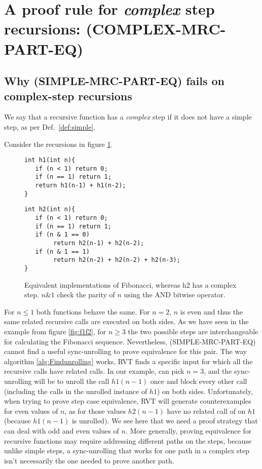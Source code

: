 \section{A proof rule for \emph{complex} step recursions: (COMPLEX-MRC-PART-EQ)}
\label{sec:multistep}
\subsection{Why (SIMPLE-MRC-PART-EQ) fails on complex-step recursions}
We say that a recursive function has a \emph{complex} step if it does not have a simple step, as per Def.~\ref{def:simple}. 

Consider the recursions in figure \ref{fig:f1f2cond}.
\begin{figure}[h]
\begin{center}
\begin{minipage}{7 cm}
\begin{lstlisting}
int h1(int n){
   if (n < 1) return 0;
   if (n == 1) return 1; 
   return h1(n-1) + h1(n-2);
}
\end{lstlisting}
\end{minipage}
\begin{minipage}{7 cm}
\begin{lstlisting}
int h2(int n){
   if (n < 1) return 0;
   if (n == 1) return 1; 
   if (n & 1 == 0)
        return h2(n-1) + h2(n-2);
   if (n & 1 == 1)
        return h2(n-2) + h2(n-2) + h2(n-3);
}
\end{lstlisting}
\end{minipage}
\caption{Equivalent implementations of Fibonacci, whereas h2 has a complex step. $n \& 1$ check the parity of $n$ using the AND bitwise operator.}
\label{fig:f1f2cond}
\end{center}
\end{figure}
For $n\leq 1$ both functions behave the same. For $n=2$, $n$ is even and thus the same related recursive calls are executed on both sides. As we have seen in the example from figure \ref{fig:f1f2}, for $n\geq3$ the two possible steps are interchangeable for calculating the Fibonacci sequence. Nevertheless, (SIMPLE-MRC-PART-EQ) cannot find a useful sync-unrolling to prove equivalence for this pair. The way algorithm \ref{alg:Findunrolling} works, RVT finds a specific input for which all the recursive calls have related calls. In our example,  can pick $n=3$, and the sync-unrolling will be to unroll the call $h1(n-1)$ once and block every other call (including the calls in the unrolled instance of $h1$) on both sides. Unfortunately, when trying to prove step case equivalence, RVT will generate counterexamples for even values of $n$, as for those values $h2(n-1)$ have no related call of on $h1$ (because $h1(n-1)$ is unrolled). We see here that we need a proof strategy that can deal with odd and even values of $n$. More generally, proving equivalence for recursive functions may require addressing different paths on the steps, because unlike simple steps, a sync-unrolling that works for one path in a complex step isn't necessarily the one needed to prove another path.

